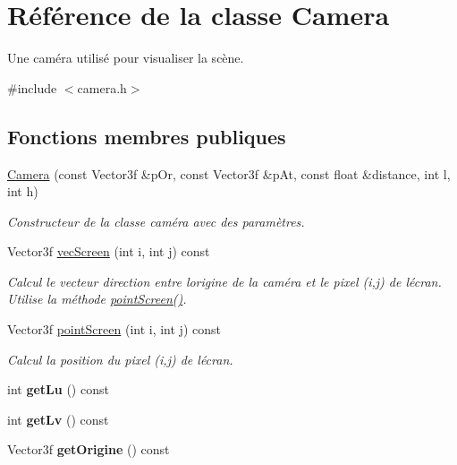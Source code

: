 \hypertarget{class_camera}{}\section{Référence de la classe Camera}
\label{class_camera}


Une caméra utilisé pour visualiser la scène.  




{\ttfamily \#include $<$camera.\+h$>$}

\subsection*{Fonctions membres publiques}
\begin{DoxyCompactItemize}
\item 
\hyperlink{class_camera_a073a52c602bcad47cd77c11215d884eb}{Camera} (const Vector3f \&p\+Or, const Vector3f \&p\+At, const float \&distance, int l, int h)
\begin{DoxyCompactList}\small\item\em Constructeur de la classe caméra avec des paramètres. \end{DoxyCompactList}\item 
Vector3f \hyperlink{class_camera_a280e83aa370deae3f80ab7a9c010fe34}{vec\+Screen} (int i, int j) const 
\begin{DoxyCompactList}\small\item\em Calcul le vecteur direction entre l\textquotesingle{}origine de la caméra et le pixel (i,j) de l\textquotesingle{}écran.~\newline
Utilise la méthode \hyperlink{class_camera_ad725f4860f70e5b32388c3bc8e146fbf}{point\+Screen()}. \end{DoxyCompactList}\item 
Vector3f \hyperlink{class_camera_ad725f4860f70e5b32388c3bc8e146fbf}{point\+Screen} (int i, int j) const 
\begin{DoxyCompactList}\small\item\em Calcul la position du pixel (i,j) de l\textquotesingle{}écran. \end{DoxyCompactList}\item 
\hypertarget{class_camera_a136044c6daf6dfd8617f1ed4d17db265}{}int {\bfseries get\+Lu} () const \label{class_camera_a136044c6daf6dfd8617f1ed4d17db265}

\item 
\hypertarget{class_camera_af22f296bdbe6b3705771ba8223d6bb3d}{}int {\bfseries get\+Lv} () const \label{class_camera_af22f296bdbe6b3705771ba8223d6bb3d}

\item 
\hypertarget{class_camera_a1e409a80ecbf59b62aa47e5759c0be9f}{}Vector3f {\bfseries get\+Origine} () const \label{class_camera_a1e409a80ecbf59b62aa47e5759c0be9f}

\end{DoxyCompactItemize}
